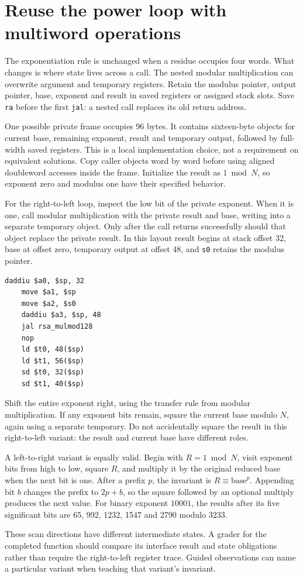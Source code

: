 \section{Reuse the power loop with multiword operations}
The exponentiation rule is unchanged when a residue occupies four words. What changes
is where state lives across a call. The nested modular multiplication can overwrite
argument and temporary registers. Retain the modulus pointer, output pointer, base,
exponent and result in saved registers or assigned stack slots. Save \texttt{ra} before
the first \texttt{jal}: a nested call replaces its old return address.

One possible private frame occupies 96 bytes. It contains sixteen-byte objects for
current base, remaining exponent, result and temporary output, followed by full-width
saved registers. This is a local implementation choice, not a requirement on equivalent
solutions. Copy caller objects word by word before using aligned doubleword accesses
inside the frame. Initialize the result as \(1\bmod N\), so exponent zero and modulus
one have their specified behavior.

For the right-to-left loop, inspect the low bit of the private exponent. When it is
one, call modular multiplication with the private result and base, writing into a
separate temporary object. Only after the call returns successfully should that object
replace the private result. In this layout result begins at stack offset 32, base at
offset zero, temporary output at offset 48, and \texttt{s0} retains the modulus pointer.

\begin{verbatim}
daddiu $a0, $sp, 32
    move $a1, $sp
    move $a2, $s0
    daddiu $a3, $sp, 48
    jal rsa_mulmod128
    nop
    ld $t0, 48($sp)
    ld $t1, 56($sp)
    sd $t0, 32($sp)
    sd $t1, 40($sp)
\end{verbatim}

Shift the entire exponent right, using the transfer rule from modular multiplication.
If any exponent bits remain, square the current base modulo \(N\), again using a
separate temporary. Do not accidentally square the result in this right-to-left
variant: the result and current base have different roles.

A left-to-right variant is equally valid. Begin with \(R=1\bmod N\), visit exponent
bits from high to low, square \(R\), and multiply it by the original reduced base when
the next bit is one. After a prefix \(p\), the invariant is \(R\equiv\text{base}^{p}\).
Appending bit \(b\) changes the prefix to \(2p+b\), so the square followed by an optional
multiply produces the next value. For binary exponent \(10001\), the results after
its five significant bits are 65, 992, 1232, 1547 and 2790 modulo 3233.

These scan directions have different intermediate states. A grader for the completed
function should compare its interface result and state obligations rather than require
the right-to-left register trace. Guided observations can name a particular variant
when teaching that variant's invariant.
